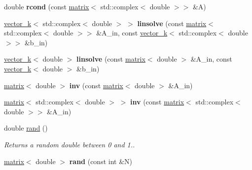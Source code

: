 \begin{DoxyCompactItemize}
\item 
\hypertarget{namespacekeycpp_a4d9a9dd04453e5a417f7a9eb8ae4391b}{double {\bfseries rcond} (const \hyperlink{classkeycpp_1_1matrix}{matrix}$<$ std\-::complex$<$ double $>$$>$ \&A)}\label{namespacekeycpp_a4d9a9dd04453e5a417f7a9eb8ae4391b}

\item 
\hypertarget{namespacekeycpp_aa0c91a82f4eadf681f9a690d6f309665}{\hyperlink{classkeycpp_1_1vector__k}{vector\-\_\-k}$<$ std\-::complex$<$ double $>$ $>$ {\bfseries linsolve} (const \hyperlink{classkeycpp_1_1matrix}{matrix}$<$ std\-::complex$<$ double $>$$>$ \&A\-\_\-in, const \hyperlink{classkeycpp_1_1vector__k}{vector\-\_\-k}$<$ std\-::complex$<$ double $>$$>$ \&b\-\_\-in)}\label{namespacekeycpp_aa0c91a82f4eadf681f9a690d6f309665}

\item 
\hypertarget{namespacekeycpp_a13a89a2c6d30c991f4de63ca8f62c0e1}{\hyperlink{classkeycpp_1_1vector__k}{vector\-\_\-k}$<$ double $>$ {\bfseries linsolve} (const \hyperlink{classkeycpp_1_1matrix}{matrix}$<$ double $>$ \&A\-\_\-in, const \hyperlink{classkeycpp_1_1vector__k}{vector\-\_\-k}$<$ double $>$ \&b\-\_\-in)}\label{namespacekeycpp_a13a89a2c6d30c991f4de63ca8f62c0e1}

\item 
\hypertarget{namespacekeycpp_adc96927cda2df7a6e8e2031941c43601}{\hyperlink{classkeycpp_1_1matrix}{matrix}$<$ double $>$ {\bfseries inv} (const \hyperlink{classkeycpp_1_1matrix}{matrix}$<$ double $>$ \&A\-\_\-in)}\label{namespacekeycpp_adc96927cda2df7a6e8e2031941c43601}

\item 
\hypertarget{namespacekeycpp_a9085342fc708fd5babae39321da3b89a}{\hyperlink{classkeycpp_1_1matrix}{matrix}$<$ std\-::complex$<$ double $>$ $>$ {\bfseries inv} (const \hyperlink{classkeycpp_1_1matrix}{matrix}$<$ std\-::complex$<$ double $>$$>$ \&A\-\_\-in)}\label{namespacekeycpp_a9085342fc708fd5babae39321da3b89a}

\item 
\hypertarget{namespacekeycpp_a5ef5c1f5951e8182a7c4ec9612f3f7e1}{double \hyperlink{namespacekeycpp_a5ef5c1f5951e8182a7c4ec9612f3f7e1}{rand} ()}\label{namespacekeycpp_a5ef5c1f5951e8182a7c4ec9612f3f7e1}

\begin{DoxyCompactList}\small\item\em Returns a random double between 0 and 1.. \end{DoxyCompactList}\item 
\hypertarget{namespacekeycpp_ac224964eb5e1a55c3f7d58f0e9b71d3d}{\hyperlink{classkeycpp_1_1matrix}{matrix}$<$ double $>$ {\bfseries rand} (const int \&N)}\label{namespacekeycpp_ac224964eb5e1a55c3f7d58f0e9b71d3d}


\end{DoxyCompactItemize}
